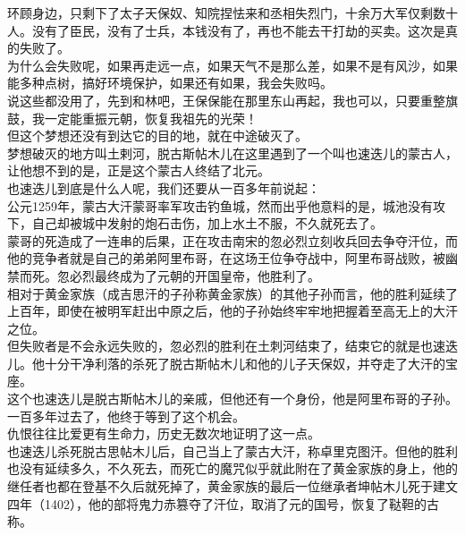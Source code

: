 \begin{multicols}{\theparacolNo}
环顾身边，只剩下了太子天保奴、知院捏怯来和丞相失烈门，十余万大军仅剩数十人。没有了臣民，没有了士兵，本钱没有了，再也不能去干打劫的买卖。这次是真的失败了。\\

为什么会失败呢，如果再走远一点，如果天气不是那么差，如果不是有风沙，如果能多种点树，搞好环境保护，如果还有如果，我会失败吗。\\

说这些都没用了，先到和林吧，王保保能在那里东山再起，我也可以，只要重整旗鼓，我一定能重振元朝，恢复我祖先的光荣！\\

但这个梦想还没有到达它的目的地，就在中途破灭了。\\

梦想破灭的地方叫土剌河，脱古斯帖木儿在这里遇到了一个叫也速迭儿的蒙古人，让他想不到的是，正是这个蒙古人终结了北元。\\

也速迭儿到底是什么人呢，我们还要从一百多年前说起：\\

公元1259年，蒙古大汗蒙哥率军攻击钓鱼城，然而出乎他意料的是，城池没有攻下，自己却被城中发射的炮石击伤，加上水土不服，不久就死去了。\\

蒙哥的死造成了一连串的后果，正在攻击南宋的忽必烈立刻收兵回去争夺汗位，而他的竞争者就是自己的弟弟阿里布哥，在这场王位争夺战中，阿里布哥战败，被幽禁而死。忽必烈最终成为了元朝的开国皇帝，他胜利了。\\

相对于黄金家族（成吉思汗的子孙称黄金家族）的其他子孙而言，他的胜利延续了上百年，即使在被明军赶出中原之后，他的子孙始终牢牢地把握着至高无上的大汗之位。\\

但失败者是不会永远失败的，忽必烈的胜利在土刺河结束了，结束它的就是也速迭儿。他十分干净利落的杀死了脱古斯帖木儿和他的儿子天保奴，并夺走了大汗的宝座。\\

这个也速迭儿是脱古斯帖木儿的亲戚，但他还有一个身份，他是阿里布哥的子孙。一百多年过去了，他终于等到了这个机会。\\

仇恨往往比爱更有生命力，历史无数次地证明了这一点。\\

也速迭儿杀死脱古思帖木儿后，自己当上了蒙古大汗，称卓里克图汗。但他的胜利也没有延续多久，不久死去，而死亡的魔咒似乎就此附在了黄金家族的身上，他的继任者也都在登基不久后就死掉了，黄金家族的最后一位继承者坤帖木儿死于建文四年（1402），他的部将鬼力赤篡夺了汗位，取消了元的国号，恢复了鞑靼的古称。\\


\end{multicols}
